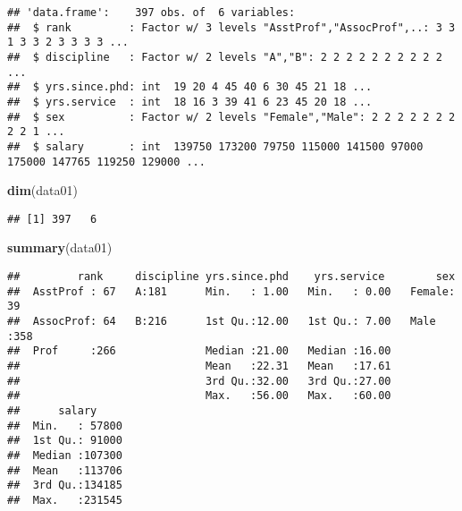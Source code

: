 \documentclass[]{article}
\newenvironment{Shaded}{\begin{snugshade}}{\end{snugshade}}
\newcommand{\KeywordTok}[1]{\textcolor[rgb]{0.13,0.29,0.53}{\textbf{{#1}}}}
\newcommand{\CommentTok}[1]{\textcolor[rgb]{0.56,0.35,0.01}{\textit{{#1}}}}
\newcommand{\NormalTok}[1]{{#1}}
\begin{document}
\begin{verbatim}
## 'data.frame':    397 obs. of  6 variables:
##  $ rank         : Factor w/ 3 levels "AsstProf","AssocProf",..: 3 3 1 3 3 2 3 3 3 3 ...
##  $ discipline   : Factor w/ 2 levels "A","B": 2 2 2 2 2 2 2 2 2 2 ...
##  $ yrs.since.phd: int  19 20 4 45 40 6 30 45 21 18 ...
##  $ yrs.service  : int  18 16 3 39 41 6 23 45 20 18 ...
##  $ sex          : Factor w/ 2 levels "Female","Male": 2 2 2 2 2 2 2 2 2 1 ...
##  $ salary       : int  139750 173200 79750 115000 141500 97000 175000 147765 119250 129000 ...
\end{verbatim}

\begin{Shaded}
\begin{Highlighting}[]
\KeywordTok{dim}\NormalTok{(data01)}
\end{Highlighting}
\end{Shaded}

\begin{verbatim}
## [1] 397   6
\end{verbatim}

\begin{Shaded}
\begin{Highlighting}[]
\KeywordTok{summary}\NormalTok{(data01)}
\end{Highlighting}
\end{Shaded}

\begin{verbatim}
##         rank     discipline yrs.since.phd    yrs.service        sex     
##  AsstProf : 67   A:181      Min.   : 1.00   Min.   : 0.00   Female: 39  
##  AssocProf: 64   B:216      1st Qu.:12.00   1st Qu.: 7.00   Male  :358  
##  Prof     :266              Median :21.00   Median :16.00               
##                             Mean   :22.31   Mean   :17.61               
##                             3rd Qu.:32.00   3rd Qu.:27.00               
##                             Max.   :56.00   Max.   :60.00               
##      salary      
##  Min.   : 57800  
##  1st Qu.: 91000  
##  Median :107300  
##  Mean   :113706  
##  3rd Qu.:134185  
##  Max.   :231545
\end{verbatim}

\begin{Shaded}
\end{Shaded}
\end{document}
